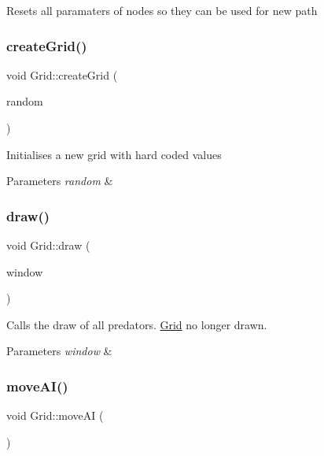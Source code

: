 Resets all paramaters of nodes so they can be used for new path 

\mbox{\label{class_grid_af63dd2374a80c307414dae303b0d052e}} 
\subsubsection{\texorpdfstring{createGrid()}{createGrid()}}
{\footnotesize\ttfamily void Grid\+::create\+Grid (\begin{DoxyParamCaption}\item[{int}]{random }\end{DoxyParamCaption})\hspace{0.3cm}{\ttfamily [private]}}



Initialises a new grid with hard coded values 


\begin{DoxyParams}{Parameters}
{\em random} & \\
\hline
\end{DoxyParams}
\mbox{\label{class_grid_a9b42b1d0dcfc434d790b11faf4b461ce}} 
\subsubsection{\texorpdfstring{draw()}{draw()}}
{\footnotesize\ttfamily void Grid\+::draw (\begin{DoxyParamCaption}\item[{sf\+::\+Render\+Window \&}]{window }\end{DoxyParamCaption})}



Calls the draw of all predators. \mbox{\hyperlink{class_grid}{Grid}} no longer drawn. 


\begin{DoxyParams}{Parameters}
{\em window} & \\
\hline
\end{DoxyParams}
\mbox{\label{class_grid_aa662cb1071e1138c1c4cf1ddd592146b}} 
\subsubsection{\texorpdfstring{moveAI()}{moveAI()}}
{\footnotesize\ttfamily void Grid\+::move\+AI (\begin{DoxyParamCaption}{ }\end{DoxyParamCaption})\hspace{0.3cm}{\ttfamily [private]}}



